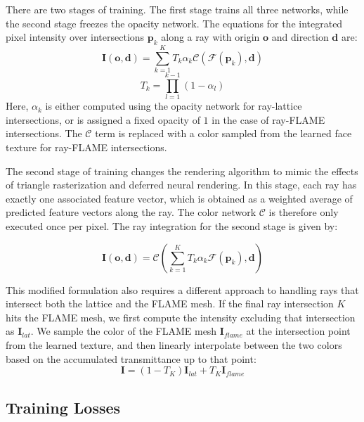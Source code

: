 There are two stages of training. The first stage trains all three networks, while the second stage freezes the opacity network. The equations for the integrated pixel intensity over intersections $\textbf{p}_k$ along a ray with origin $\textbf{o}$ and direction $\textbf{d}$ are:
\begin{equation}
    \textbf{I}(\textbf{o}, \textbf{d}) = \sum_{k=1}^{K} T_k \alpha_k \mathcal{C}(\mathcal{F}(\textbf{p}_k), \textbf{d}) 
\end{equation}
\begin{equation}
    T_k = \prod_{l=1}^{k-1}(1 - \alpha_l)
\end{equation}
Here, $\alpha_k$ is either computed using the opacity network for ray-lattice intersections, or is assigned a fixed opacity of $1$ in the case of ray-FLAME intersections. The $\mathcal{C}$ term is replaced with a color sampled from the learned face texture for ray-FLAME intersections.

The second stage of training changes the rendering algorithm to mimic the effects of triangle rasterization and deferred neural rendering. In this stage, each ray has exactly one associated feature vector, which is obtained as a weighted average of predicted feature vectors along the ray. The color network $\mathcal{C}$ is therefore only executed once per pixel. The ray integration for the second stage is given by:


\begin{equation}
    \label{eq_stage2_rendering}
    \textbf{I}(\textbf{o}, \textbf{d}) = \mathcal{C}\left(\sum_{k=1}^{K} T_k \alpha_k \mathcal{F}(\textbf{p}_k), \textbf{d}\right)
\end{equation}

This modified formulation also requires a different approach to handling rays that intersect both the lattice and the FLAME mesh. If the final ray intersection $K$ hits the FLAME mesh, we first compute the intensity excluding that intersection as $\textbf{I}_{lat}$. We sample the color of the FLAME mesh $\textbf{I}_{flame}$ at the intersection point from the learned texture, and then linearly interpolate between the two colors based on the accumulated transmittance up to that point:
\begin{equation}
    \textbf{I} = (1 - T_K)\textbf{I}_{lat} + T_K \textbf{I}_{flame}
\end{equation}

\subsection{Training Losses}
\label{subsec_model_losses}

